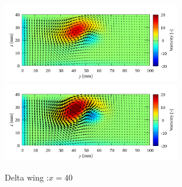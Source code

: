 \documentclass[twocolumn,a4j]{jsarticle}
\begin{document}
\begin{figure}[htbp]
{		
		\includegraphics[keepaspectratio, width=78mm]{../images/Simulation/3_kOmegaSST/x=40.png}
		\includegraphics[keepaspectratio, width=78mm]{../images/Simulation/4_Smagorinsky/x=40.png}
	}
	\caption{Delta wing :$x=40$}
\end{figure}
\end{document}

